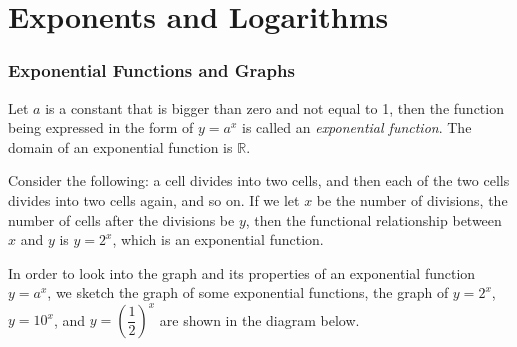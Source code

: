 \documentclass[12pt]{report}
\begin{document}
\chapter{Exponents and Logarithms}

\subsection*{Exponential Functions and Graphs}

Let $a$ is a constant that is bigger than zero and not equal to 1, then the
function being expressed in the form of $y = a^x$ is called an
\emph{exponential function}. The domain of an exponential function is
$\mathbb{R}$.

Consider the following: a cell divides into two cells, and then each of the two
cells divides into two cells again, and so on. If we let $x$ be the number of
divisions, the number of cells after the divisions be $y$, then the functional
relationship between $x$ and $y$ is $y = 2^x$, which is an exponential
function.

In order to look into the graph and its properties of an exponential function
$y = a^x$, we sketch the graph of some exponential functions, the graph of $y =
    2^x$, $y = 10^x$, and $y = {\left(\dfrac{1}{2}\right)}^x$ are shown in the
diagram below.
\end{document}
